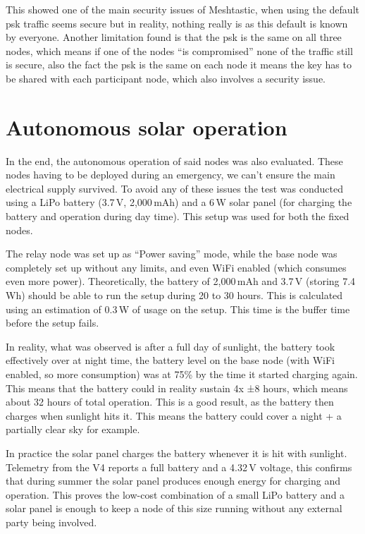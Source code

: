 This showed one of the main security issues of Meshtastic, when using the default \gls{psk} traffic seems secure but in reality, nothing really is as this default is known by everyone.
Another limitation found is that the \gls{psk} is the same on all three nodes, which means if one of the nodes ``is compromised'' none of the traffic still is secure, also the fact the \gls{psk} is the same
on each node it means the key has to be shared with each participant node, which also involves a security issue.

\section{Autonomous solar operation}%
\label{sec:poc-solar}

In the end, the autonomous operation of said nodes was also evaluated. These nodes having to be deployed during an emergency, we can't ensure the main electrical supply survived.
To avoid any of these issues the test was conducted using a LiPo battery (3.7\,V, 2,000\,mAh) and a 6\,W solar panel (for charging the battery and operation during day time).
This setup was used for both the fixed nodes.

The relay node was set up as ``Power saving'' mode, while the base node was completely set up without any limits, and even WiFi enabled (which consumes even more power).
Theoretically, the battery of 2,000\,mAh and 3.7\,V (storing 7.4\,Wh) should be able to run the setup during 20 to 30 hours. This is calculated using an estimation of 0.3\,W of usage on the setup.
This time is the buffer time before the setup fails.

In reality, what was observed is after a full day of sunlight, the battery took effectively over at night time, the battery level on the base node (with WiFi enabled, so more consumption) was at 75\% by the time it started charging again.
This means that the battery could in reality sustain 4x ±8 hours, which means about 32 hours of total operation. This is a good result, as the battery then charges when sunlight hits it. This means the battery could cover a night + a partially clear sky for example.

In practice the solar panel charges the battery whenever it is hit with sunlight. Telemetry from the V4 reports a full battery and a 4.32\,V voltage, this confirms that during summer the solar panel produces enough energy for charging and operation.
This proves the low-cost combination of a small LiPo battery and a solar panel is enough to keep a node of this size running without any external party being involved.

